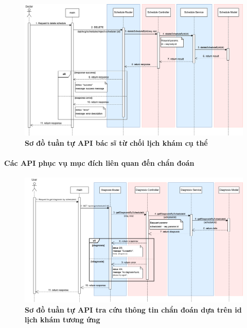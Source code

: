 \begin{figure}[H]
	\centering
	\includegraphics[width=16cm]{Images/api_sequence/schedule/deleteScheduleById.drawio.png}
	\caption[Sơ đồ tuần tự API từ chối lịch khám cụ thể]{\bfseries \fontsize{12pt}{0pt}\selectfont Sơ đồ tuần tự API bác sĩ từ chối lịch khám cụ thể}
	\label{sequence_diagram_reject_schedule}
\end{figure}

\paragraph{Các API phục vụ mục đích liên quan đến chẩn đoán}
\mbox{}

\begin{figure}[H]
	\centering
	\includegraphics[width=16cm]{Images/api_sequence/diag/getByScheduleId.drawio.png}
	\caption[Sơ đồ tuần tự API tra cứu thông tin chẩn đoán dựa trên id lịch khám tương ứng]{\bfseries \fontsize{12pt}{0pt}\selectfont Sơ đồ tuần tự API tra cứu thông tin chẩn đoán dựa trên id lịch khám tương ứng}
	\label{sequence_diagram_get_diagnosis_by_schedule}
\end{figure}

